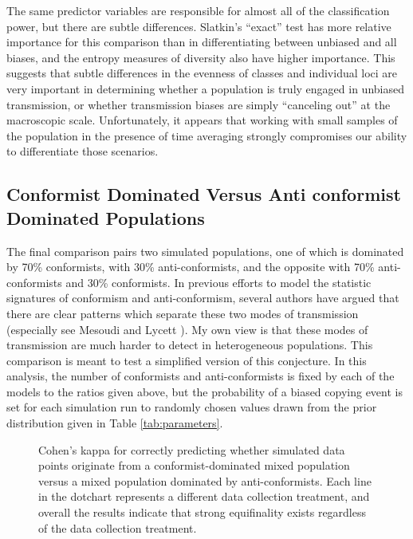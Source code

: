The same predictor variables are responsible for almost all of the classification power, but there are subtle differences.  Slatkin's ``exact'' test has more relative importance for this comparison than in differentiating between unbiased and all biases, and the entropy measures of diversity also have higher importance.  This suggests that subtle differences in the evenness of classes and individual loci are very important in determining whether a population is truly engaged in unbiased transmission, or whether transmission biases are simply ``canceling out'' at the macroscopic scale.  Unfortunately, it appears that working with small samples of the population in the presence of time averaging strongly compromises our ability to differentiate those scenarios.

\subsection{Conformist Dominated Versus Anti conformist Dominated
Populations}\label{conformist-dominated-versus-anticonformist-dominated-populations}

The final comparison pairs two simulated populations, one of which is dominated by 70\% conformists, with 30\% anti-conformists, and the opposite with 70\% anti-conformists and 30\% conformists.  In previous efforts to model the statistic signatures of conformism and anti-conformism, several authors have argued that there are clear patterns which separate these two modes of transmission (especially see Mesoudi and Lycett \cite{Mesoudi2009}).  My own view is that these modes of transmission are much harder to detect in heterogeneous populations.  This comparison is meant to test a simplified version of this conjecture. In this analysis, the number of conformists and anti-conformists is fixed by each of the models to the ratios given above, but the probability of a biased copying event is set for each simulation run to randomly chosen values drawn from the prior distribution given in Table \ref{tab:parameters}.   

\begin{figure}[h]
\caption{Cohen's kappa for correctly predicting whether simulated data points originate from a conformist-dominated mixed population versus a mixed population dominated by anti-conformists.  Each line in the dotchart represents a different data collection treatment, and overall the results indicate that strong equifinality exists regardless of the data collection treatment.}
\label{fig6}
\end{figure}

